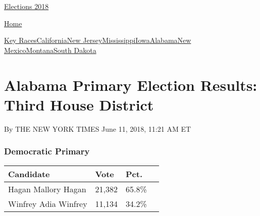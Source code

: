 \href{//www.nytimes3xbfgragh.onion}{}\href{https://www.nytimes3xbfgragh.onion/interactive/2018/us/elections/calendar-primary-results.html}{
Elections 2018}

\href{//www.nytimes3xbfgragh.onion}{ Home}

\href{https://www.nytimes3xbfgragh.onion/interactive/2018/06/05/us/elections/results-california-new-jersey-iowa-primaries.html}{Key
Races}\href{https://www.nytimes3xbfgragh.onion/interactive/2018/06/05/us/elections/results-california-primary-elections.html}{California}\href{https://www.nytimes3xbfgragh.onion/interactive/2018/06/05/us/elections/results-new-jersey-primary-elections.html}{New
Jersey}\href{https://www.nytimes3xbfgragh.onion/interactive/2018/06/05/us/elections/results-mississippi-primary-elections.html}{Mississippi}\href{https://www.nytimes3xbfgragh.onion/interactive/2018/06/05/us/elections/results-iowa-primary-elections.html}{Iowa}\href{https://www.nytimes3xbfgragh.onion/interactive/2018/06/05/us/elections/results-alabama-primary-elections.html}{Alabama}\href{https://www.nytimes3xbfgragh.onion/interactive/2018/06/05/us/elections/results-new-mexico-primary-elections.html}{New
Mexico}\href{https://www.nytimes3xbfgragh.onion/interactive/2018/06/05/us/elections/results-montana-primary-elections.html}{Montana}\href{https://www.nytimes3xbfgragh.onion/interactive/2018/06/05/us/elections/results-south-dakota-primary-elections.html}{South
Dakota}

\hypertarget{alabama-primary-election-results-third-house-district}{%
\section{Alabama Primary Election Results: Third House
District}\label{alabama-primary-election-results-third-house-district}}

By THE NEW YORK TIMES June 11, 2018, 11:21 AM ET

\hypertarget{democratic-primary}{%
\subsubsection{Democratic Primary}\label{democratic-primary}}

\begin{longtable}[]{@{}llll@{}}
\toprule
Candidate & Vote & Pct. &\tabularnewline
\midrule
\endhead
 Hagan Mallory Hagan & 21,382 & 65.8\% &\tabularnewline
 Winfrey Adia Winfrey & 11,134 & 34.2\% &\tabularnewline
\bottomrule
\end{longtable}

